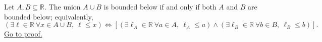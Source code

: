 \begin{proposition}
\label{prop:union-bounded-below-iff-pieces-bounded-below}
Let $A,B\subseteq\mathbb{R}$. The union $A\cup B$ is bounded below if and
only if both $A$ and $B$ are bounded below; equivalently,
\[
\left(\exists \ell\in\mathbb{R}\ \forall x\in A\cup B,\ \ell\leq x\right)
\Longleftrightarrow
\left[
\left(\exists \ell_A\in\mathbb{R}\ \forall a\in A,\ \ell_A\leq a\right)
\land
\left(\exists \ell_B\in\mathbb{R}\ \forall b\in B,\ \ell_B\leq b\right)
\right].
\]
\hyperref[prf:union-bounded-below-iff-pieces-bounded-below]{Go to proof.}
\end{proposition}